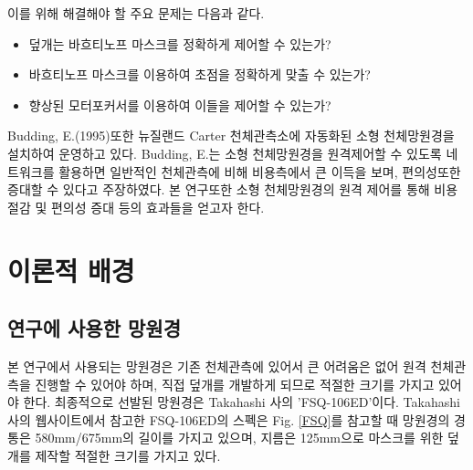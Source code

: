 \documentclass[twoside,11pt]{gshs_thesis}
\begin{document}
이를 위해 해결해야 할 주요 문제는 다음과 같다.

\begin{itemize}
\item{덮개는 바흐티노프 마스크를 정확하게 제어할 수 있는가?}\\[-34pt]
\item{바흐티노프 마스크를 이용하여 초점을 정확하게 맞출 수 있는가?}\\[-34pt]
\item{향상된 모터포커서를 이용하여 이들을 제어할 수 있는가?}
\end{itemize}


Budding, E.(1995)또한 뉴질랜드 Carter 천체관측소에 자동화된 소형 천체망원경을 설치하여 운영하고 있다. Budding, E.는 소형 천체망원경을 원격제어할 수 있도록 네트워크를 활용하면 일반적인 천체관측에 비해 비용측에서 큰 이득을 보며, 편의성또한 증대할 수 있다고 주장하였다.\cite{Budding1995auto} 본 연구또한 소형 천체망원경의 원격 제어를 통해 비용절감 및 편의성 증대 등의 효과들을 얻고자 한다.

 	
\newpage
\section{이론적 배경}


\subsection{연구에 사용한 망원경}
 
 본 연구에서 사용되는 망원경은 기존 천체관측에 있어서 큰 어려움은 없어 원격 천체관측을 진행할 수 있어야 하며, 직접 덮개를 개발하게 되므로 적절한 크기를 가지고 있어야 한다. 최종적으로 선발된 망원경은 Takahashi 사의 'FSQ-106ED'이다. Takahashi 사의 웹사이트에서 참고한 FSQ-106ED의 스펙은 Fig. \ref{FSQ}를 참고할 때 망원경의 경통은 580mm/675mm의 길이를 가지고 있으며, 지름은 125mm으로 마스크를 위한 덮개를 제작할 적절한 크기를 가지고 있다.
 
\end{document}
